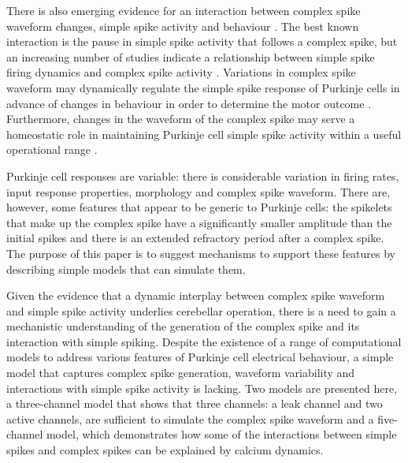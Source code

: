 \documentclass[utf8]{frontiersSCNS} %
\begin{document}
There is also emerging evidence for an interaction between complex
spike waveform changes, simple spike activity and behaviour
\cite{YangLispberger2014,StrengEtAl2017}. The best known interaction
is the pause in simple spike activity that follows a complex spike, but
an increasing number of studies indicate a relationship between simple
spike firing dynamics and complex spike activity
\cite{Mano1970,Gilbert1976,CampbellHesslow1986,HashimotoKano1998,ServaisEtAl2004,MarutaEtAl2007,WarnaarEtAl2015,BurroughsEtAl2016}.
Variations in complex spike waveform may dynamically regulate the
simple spike response of Purkinje cells in advance of changes in
behaviour in order to determine the motor outcome
\cite{StrengEtAl2017}. Furthermore, changes in the waveform of the
complex spike may serve a homeostatic role in maintaining Purkinje
cell simple spike activity within a useful operational range
\cite{BurroughsEtAl2016}.

Purkinje cell responses are variable: there is considerable variation in firing rates, input response properties, morphology and complex spike waveform. There are, however, some features that appear to be generic to Purkinje cells: the spikelets that make up the complex spike have a significantly smaller amplitude than the initial spikes and there is an extended refractory period after a complex spike. The purpose of this paper is to suggest mechanisms to support these features by describing simple models that can simulate them.

Given the evidence that a dynamic interplay between complex spike
waveform and simple spike activity underlies cerebellar operation, there is a need to gain a mechanistic understanding of the generation of the complex spike and its interaction with simple spiking. Despite the existence of a range of computational models to address various features of Purkinje cell electrical behaviour, a simple model that captures complex spike generation, waveform variability and interactions with simple spike activity is lacking. Two models are presented here, a three-channel model that shows that three channels: a leak channel and two active channels, are sufficient to simulate the complex spike waveform and a five-channel model, which demonstrates how some of the interactions between simple spikes and complex spikes can be explained by calcium dynamics. 
\end{document}
